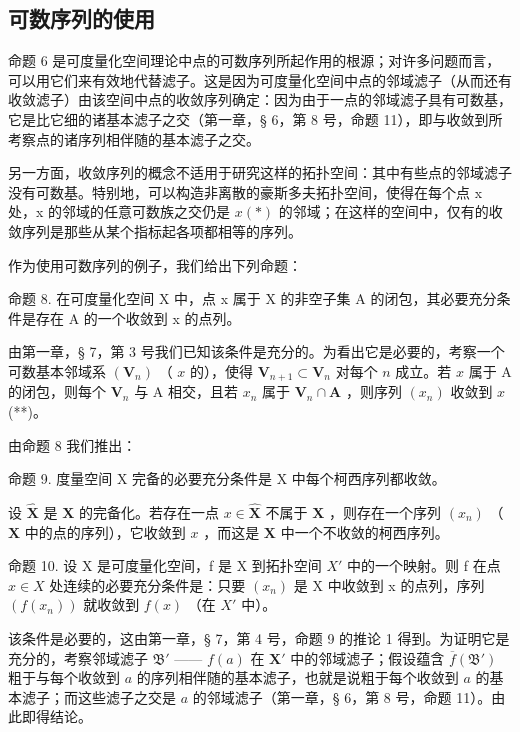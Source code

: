 \subsection{可数序列的使用}

命题 6 是可度量化空间理论中点的可数序列所起作用的根源；对许多问题而言，可以用它们来有效地代替滤子。这是因为可度量化空间中点的邻域滤子（从而还有收敛滤子）由该空间中点的收敛序列确定：因为由于一点的邻域滤子具有可数基，它是比它细的诸基本滤子之交（第一章，§ 6，第 8 号，命题 11），即与收敛到所考察点的诸序列相伴随的基本滤子之交。

另一方面，收敛序列的概念不适用于研究这样的拓扑空间：其中有些点的邻域滤子没有可数基。特别地，可以构造非离散的豪斯多夫拓扑空间，使得在每个点 x 处，x 的邻域的任意可数族之交仍是 \(x (*)\) 的邻域；在这样的空间中，仅有的收敛序列是那些从某个指标起各项都相等的序列。

作为使用可数序列的例子，我们给出下列命题：

命题 8. 在可度量化空间 X 中，点 x 属于 X 的非空子集 A 的闭包，其必要充分条件是存在 A 的一个收敛到 x 的点列。

由第一章，§ 7，第 3 号我们已知该条件是充分的。为看出它是必要的，考察一个可数基本邻域系 \((\mathbf{V}_n)\) （ \(x\) 的），使得 \(\mathbf{V}_{n+1} \subset \mathbf{V}_n\) 对每个 \(n\) 成立。若 \(x\) 属于 A 的闭包，则每个 \(\mathbf{V}_n\) 与 A 相交，且若 \(x_n\) 属于 \(\mathbf{V}_n \cap \mathbf{A}\) ，则序列 \((x_n)\) 收敛到 \(x\) (**)。

由命题 8 我们推出：

命题 9. 度量空间 X 完备的必要充分条件是 X 中每个柯西序列都收敛。

设 \(\hat{\mathbf{X}}\) 是 \(\mathbf{X}\) 的完备化。若存在一点 \(x \in \hat{\mathbf{X}}\) 不属于 \(\mathbf{X}\) ，则存在一个序列 \((x_n)\) （\(\mathbf{X}\) 中的点的序列），它收敛到 \(x\) ，而这是 \(\mathbf{X}\) 中一个不收敛的柯西序列。

命题 10. 设 X 是可度量化空间，f 是 X 到拓扑空间 \(X'\) 中的一个映射。则 f 在点 \(x \in X\) 处连续的必要充分条件是：只要 \((x_n)\) 是 X 中收敛到 x 的点列，序列 \((f(x_n))\) 就收敛到 \(f(x)\) （在 \(X'\) 中）。

该条件是必要的，这由第一章，§ 7，第 4 号，命题 9 的推论 1 得到。为证明它是充分的，考察邻域滤子 \(\mathfrak{B}'\) —— \(f(a)\) 在 \(\mathbf{X}'\) 中的邻域滤子；假设蕴含 \(\overline{f}(\mathfrak{B}')\) 粗于与每个收敛到 \(a\) 的序列相伴随的基本滤子，也就是说粗于每个收敛到 \(a\) 的基本滤子；而这些滤子之交是 \(a\) 的邻域滤子（第一章，§ 6，第 8 号，命题 11）。由此即得结论。

